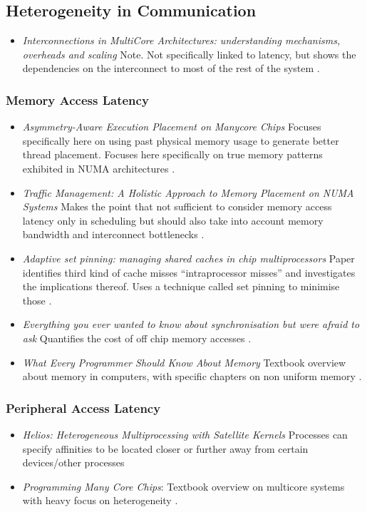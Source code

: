 \subsection{Heterogeneity in Communication}

\begin{itemize}
\item \emph{Interconnections in MultiCore Architectures: understanding mechanisms,
overheads and scaling} Note. Not specifically linked to latency, but 
shows the dependencies on the interconnect to most of the rest of the system \cite{1431574}.
\end{itemize}

\subsubsection{Memory Access Latency}
\begin{itemize}
\item \emph{Asymmetry-Aware Execution Placement on Manycore Chips} Focuses
specifically here on using past physical memory usage to generate better thread
placement. Focuses here specifically on true memory patterns exhibited in 
NUMA architectures \cite{atumanov-sfma13}.
\item \emph{Traffic Management: A Holistic Approach to Memory Placement on NUMA Systems}
Makes the point that not sufficient to consider memory access latency only in scheduling
but should also take into account memory bandwidth and interconnect bottlenecks \cite{Dashti:2013:TMH:2451116.2451157}.
\item \emph{Adaptive set pinning: managing shared caches in chip multiprocessors}
Paper identifies third kind of cache misses ``intraprocessor misses'' and
investigates the implications thereof. Uses a technique called
set pinning to minimise those \cite{Srikantaiah08adaptiveset}.
\item \emph{Everything you ever wanted to know about synchronisation but
were afraid to ask} Quantifies the cost of off chip memory accesses \cite{David:2013:EYA:2517349.2522714}.
\item \emph{What Every Programmer Should Know About Memory} Textbook overview
about memory in computers, with specific chapters on non uniform memory \cite{Drepper07whatevery}.
\end{itemize}
\subsubsection{Peripheral Access Latency}
\begin{itemize}
\item \emph{Helios: Heterogeneous Multiprocessing with Satellite Kernels} 
Processes can specify affinities to be located closer or further away 
from certain devices/other processes
\cite{Nightingale:2009:HHM:1629575.1629597}
\item \emph{Programming Many Core Chips}: Textbook overview
on multicore systems with heavy focus on heterogeneity \cite{Vajda:1414193}.
\end{itemize}
